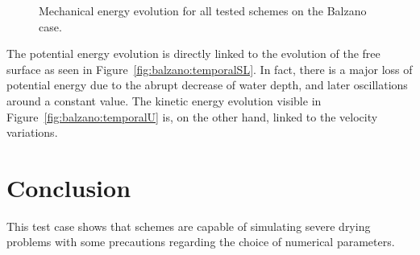 \begin{figure}[H]
  \centering
  \caption{Mechanical energy evolution for all tested schemes on the Balzano case.}
\label{fig:balzano:Em}
\end{figure}

The potential energy evolution is directly linked to the evolution of the free surface as
seen in Figure~\ref{fig:balzano:temporalSL}. In fact, there is a major loss of
potential energy due to the abrupt decrease of water depth, and later oscillations around a constant value.
The kinetic energy evolution visible in Figure~\ref{fig:balzano:temporalU} is,
on the other hand, linked to the velocity variations.



%
\section{Conclusion}

This test case shows that  schemes are capable of simulating severe drying problems
with some precautions regarding the choice of numerical parameters.


